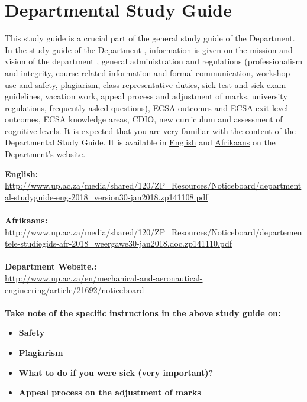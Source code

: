 \section{Departmental Study Guide} \label{sec:dep_study_guide}
    This study guide is a crucial part of the general study guide of the
    Department. In the study guide of the Department , information is given on
    the mission and vision of the department , general administration and
    regulations (professionalism and integrity, course related information and
    formal communication, workshop use and safety, plagiarism, class
    representative duties, sick test and sick exam guidelines, vacation work,
    appeal process and adjustment of marks, university regulations, frequently
    asked questions), ECSA outcomes and ECSA exit level outcomes, ECSA
    knowledge areas, CDIO, new curriculum and assessment of cognitive levels.
    It is expected that you are very familiar with the content of the
    Departmental Study Guide. It is available in
    \href{http://www.up.ac.za/media/shared/120/ZP_Resources/Noticeboard/departmental-studyguide-eng-2018_version30-jan2018.zp141108.pdf}{English}
    and
    \href{http://www.up.ac.za/media/shared/120/ZP_Resources/Noticeboard/departementele-studiegids-afr-2018_weergawe30-jan2018.doc.zp141110.pdf}{Afrikaans}
    on the
    \href{http://www.up.ac.za/en/mechanical-and-aeronautical-engineering/article/21692/noticeboard}{Department’s website}.

    \noindent
    \textbf{English:} \\
    \url{http://www.up.ac.za/media/shared/120/ZP_Resources/Noticeboard/departmental-studyguide-eng-2018_version30-jan2018.zp141108.pdf} \\~\\
    \textbf{Afrikaans:} \\
    \url{http://www.up.ac.za/media/shared/120/ZP_Resources/Noticeboard/departementele-studiegids-afr-2018_weergawe30-jan2018.doc.zp141110.pdf} \\~\\
    \textbf{Department Website.:} \\
    \url{http://www.up.ac.za/en/mechanical-and-aeronautical-engineering/article/21692/noticeboard} \\~\\

    \noindent
    \textbf{Take note of the \uline{specific instructions} in the above study guide on:}
    \begin{itemize}
        \item \textbf{Safety}
        \item \textbf{Plagiarism}
        \item \textbf{What to do if you were sick (very important)?}
        \item \textbf{Appeal process on the adjustment of marks}
    \end{itemize}

